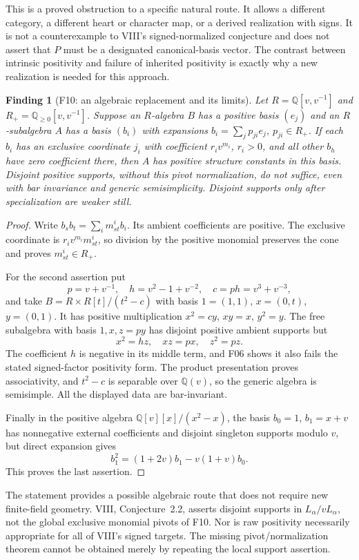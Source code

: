 \documentclass[11pt,a4paper]{article}
\newcommand{\Q}{\mathbb Q}\newcommand{\Z}{\mathbb Z}\newcommand{\C}{\mathbb C}\newcommand{\N}{\mathbb N}\newcommand{\F}{\mathbb F}
\newcommand{\fid}[1]{\textsf{#1}}\newcommand{\gate}[1]{\textsf{#1}}
\theoremstyle{named}\newtheorem{finding}{Finding}[section]
\theoremstyle{definition}\newtheorem{definition}[finding]{Definition}
\theoremstyle{remark}\newtheorem{remark}[finding]{Remark}
\begin{document}
This is a proved obstruction to a specific natural route. It allows a different category, a different heart or character map, or a derived realization with signs. It is not a counterexample to VIII's signed-normalized conjecture and does not assert that $P$ must be a designated canonical-basis vector. The contrast between intrinsic positivity and failure of inherited positivity is exactly why a new realization is needed for this approach.

\begin{finding}[\fid{F10}: an algebraic replacement and its limits]\label{f:pivots}
Let $R=\Q[v,v^{-1}]$ and $R_+=\Q_{\ge0}[v,v^{-1}]$. Suppose an $R$-algebra $B$ has a positive basis $(e_j)$ and an $R$-subalgebra $A$ has a basis $(b_i)$ with expansions $b_i=\sum_jp_{ji}e_j$, $p_{ji}\in R_+$. If each $b_i$ has an exclusive coordinate $j_i$ with coefficient $r_iv^{m_i}$, $r_i>0$, and all other $b_h$ have zero coefficient there, then $A$ has positive structure constants in this basis. Disjoint positive supports, without this pivot normalization, do not suffice, even with bar invariance and generic semisimplicity. Disjoint supports only after specialization are weaker still.
\end{finding}
\begin{proof}
Write $b_sb_t=\sum_i m_{st}^i b_i$. Its ambient coefficients are positive. The exclusive coordinate is $r_iv^{m_i}m_{st}^i$, so division by the positive monomial preserves the cone and proves $m_{st}^i\in R_+$.

For the second assertion put
\[
 p=v+v^{-1},\quad h=v^2-1+v^{-2},\quad c=ph=v^3+v^{-3},
\]
and take $B=R\times R[t]/(t^2-c)$ with basis
$1=(1,1)$, $x=(0,t)$, $y=(0,1)$. It has positive multiplication
$x^2=cy$, $xy=x$, $y^2=y$. The free subalgebra with basis $1,x,z=py$ has disjoint positive ambient supports but
\[
 x^2=hz,\quad xz=px,\quad z^2=pz.
\]
The coefficient $h$ is negative in its middle term, and \fid{F06} shows it also fails the stated signed-factor positivity form. The product presentation proves associativity, and $t^2-c$ is separable over $\Q(v)$, so the generic algebra is semisimple. All the displayed data are bar-invariant.

Finally in the positive algebra $\Q[v][x]/(x^2-x)$, the basis $b_0=1$, $b_1=x+v$ has nonnegative external coefficients and disjoint singleton supports modulo $v$, but direct expansion gives
\[
 b_1^2=(1+2v)b_1-v(1+v)b_0.
\]
This proves the last assertion.
\end{proof}
The statement provides a possible algebraic route that does not require new finite-field geometry. VIII, Conjecture~2.2, asserts disjoint supports in $L_\alpha/vL_\alpha$, not the global exclusive monomial pivots of \fid{F10}. Nor is raw positivity necessarily appropriate for all of VIII's signed targets. The missing pivot/normalization theorem cannot be obtained merely by repeating the local support assertion.
\end{document}
